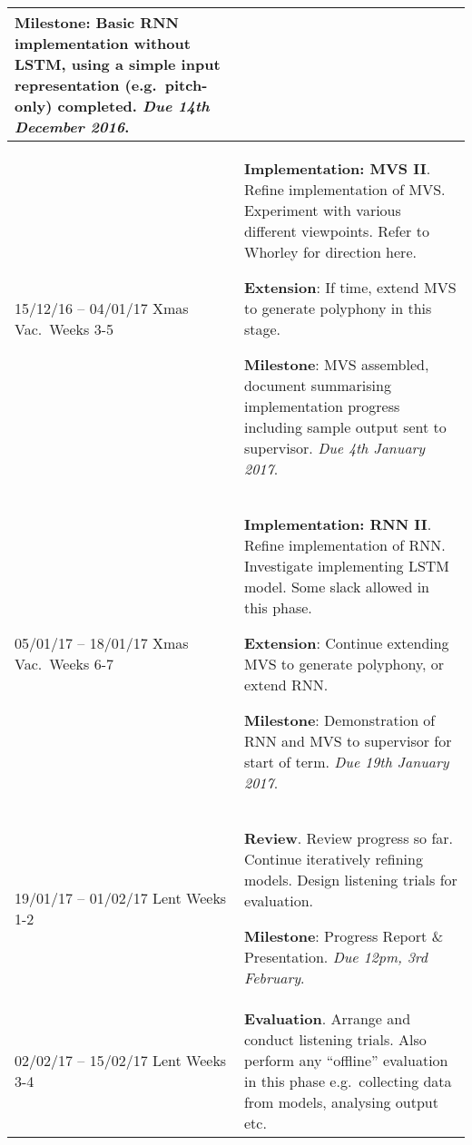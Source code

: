 \documentclass[12pt,a4paper,twoside]{article}
\begin{document}
\begin{longtable}{ p{4cm} | p{11cm} }
\textbf{Milestone}: Basic RNN implementation without LSTM, using a simple input
representation (e.g.\ pitch-only) completed. \newline 
\emph{Due 14th December 2016}.
\\ \hline

15/12/16 -- 04/01/17 Xmas Vac.\ Weeks 3-5 & \textbf{Implementation: MVS II}.
Refine implementation of MVS. Experiment with various different viewpoints.
Refer to Whorley \cite{whorley2013phd} for direction here.
\newline\vspace{0mm}

\textbf{Extension}: If time, extend MVS to generate polyphony in this stage. 
\newline\vspace{0mm}

\textbf{Milestone}: MVS assembled, document summarising implementation progress
including sample output sent to supervisor. 
\newline \emph{Due 4th January 2017}.
\\ \hline
05/01/17 -- 18/01/17 Xmas Vac.\ Weeks 6-7 & \textbf{Implementation: RNN II}.
Refine implementation of RNN. Investigate implementing LSTM model. Some slack
allowed in this phase. \newline\vspace{0mm}

\textbf{Extension}: Continue extending MVS to generate polyphony, or extend
RNN. \newline\vspace{0mm}

\textbf{Milestone}: Demonstration of RNN and MVS to supervisor for start of
term. \emph{Due 19th January 2017}.
\\ \hline

19/01/17 -- 01/02/17 Lent Weeks 1-2 & \textbf{Review}.
Review progress so far. Continue iteratively refining models. Design listening
trials for evaluation. \newline\vspace{0mm}

\textbf{Milestone}: Progress Report \& Presentation. \emph{Due 12pm, 3rd
	February}.
\\ \hline

02/02/17 -- 15/02/17 Lent Weeks 3-4 & \textbf{Evaluation}.
Arrange and conduct listening trials. Also perform any ``offline'' evaluation in
this phase e.g.\ collecting data from models, analysing output etc.
\newline\vspace{0mm}


\end{longtable}
\end{document}
